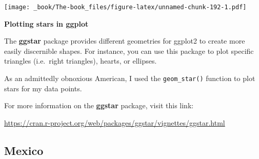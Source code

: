 \documentclass[
]{book}
\begin{document}
\texttt{[image: \_book/The-book\_files/figure-latex/unnamed-chunk-192-1.pdf]}

\begin{blackbox}

\begin{center}
\textbf{Plotting stars in ggplot}

\end{center}

The \textbf{ggstar} package provides different geometries for ggplot2 to create more easily discernible shapes. For instance, you can use this package to plot specific triangles (i.e.~right triangles), hearts, or ellipses.

As an admittedly obnoxious American, I used the \texttt{geom\_star()} function to plot stars for my data points.

For more information on the \textbf{ggstar} package, visit this link:

\url{https://cran.r-project.org/web/packages/ggstar/vignettes/ggstar.html}

\end{blackbox}

\hypertarget{mexico}{%
\subsection{Mexico}\label{mexico}}
\end{document}
